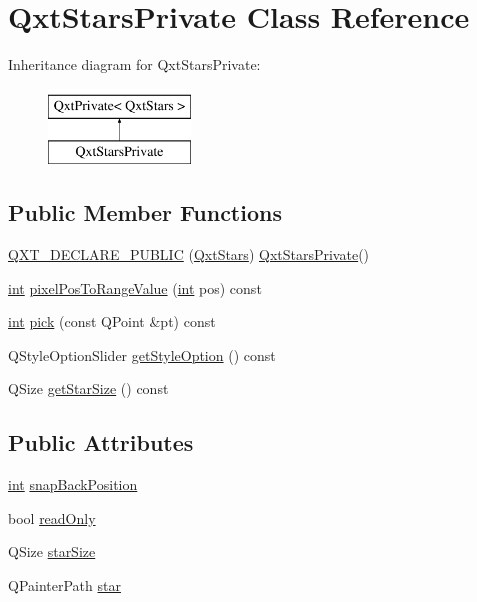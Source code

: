 \hypertarget{class_qxt_stars_private}{\section{Qxt\-Stars\-Private Class Reference}
\label{class_qxt_stars_private}
}
Inheritance diagram for Qxt\-Stars\-Private\-:\begin{figure}[H]
\begin{center}
\leavevmode
\includegraphics[height=2.000000cm]{class_qxt_stars_private}
\end{center}
\end{figure}
\subsection*{Public Member Functions}
\begin{DoxyCompactItemize}
\item 
\hyperlink{class_qxt_stars_private_ae0af9e4ea09a1c18392c860b56308ff9}{Q\-X\-T\-\_\-\-D\-E\-C\-L\-A\-R\-E\-\_\-\-P\-U\-B\-L\-I\-C} (\hyperlink{class_qxt_stars}{Qxt\-Stars}) \hyperlink{class_qxt_stars_private}{Qxt\-Stars\-Private}()
\item 
\hyperlink{ioapi_8h_a787fa3cf048117ba7123753c1e74fcd6}{int} \hyperlink{class_qxt_stars_private_a7981fa64a1ba9245cca5e925f606727f}{pixel\-Pos\-To\-Range\-Value} (\hyperlink{ioapi_8h_a787fa3cf048117ba7123753c1e74fcd6}{int} pos) const 
\item 
\hyperlink{ioapi_8h_a787fa3cf048117ba7123753c1e74fcd6}{int} \hyperlink{class_qxt_stars_private_a8a67ab1dfcba423caf34a1b1b0069dc7}{pick} (const Q\-Point \&pt) const 
\item 
Q\-Style\-Option\-Slider \hyperlink{class_qxt_stars_private_a0a1ca52398d25f772773a7dd562e8f3e}{get\-Style\-Option} () const 
\item 
Q\-Size \hyperlink{class_qxt_stars_private_a9a90c0b62d114985abbfcf225b40f5f0}{get\-Star\-Size} () const 
\end{DoxyCompactItemize}
\subsection*{Public Attributes}
\begin{DoxyCompactItemize}
\item 
\hyperlink{ioapi_8h_a787fa3cf048117ba7123753c1e74fcd6}{int} \hyperlink{class_qxt_stars_private_a2a94d55f6a148d3cc66f75cd809022cf}{snap\-Back\-Position}
\item 
bool \hyperlink{class_qxt_stars_private_ab2c87ec30f37d6f419e3100ef057afcc}{read\-Only}
\item 
Q\-Size \hyperlink{class_qxt_stars_private_ae0883c539a5ef78957b5ca48200e926b}{star\-Size}
\item 
Q\-Painter\-Path \hyperlink{class_qxt_stars_private_a009ed2c586b4fb21bf32f53dcfd492ee}{star}
\end{DoxyCompactItemize}
